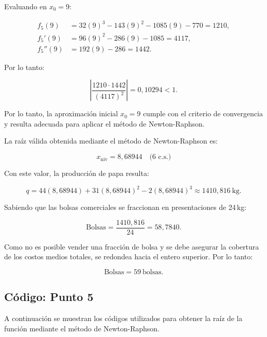 Evaluando en $x_0 = 9$:

\begin{align}
    f_5(9) &= 32(9)^3 - 143(9)^2 - 1085(9) - 770 = 1210, \\[4pt]
    f_5'(9) &= 96(9)^2 - 286(9) - 1085 = 4117, \\[4pt]
    f_5''(9) &= 192(9) - 286 = 1442.
\end{align}

Por lo tanto:

\begin{equation}
    \left|
    \frac{1210 \cdot 1442}
    {(4117)^2}
    \right|
    =
    0{,}10294 < 1.
\end{equation}

Por lo tanto, la aproximación inicial $x_0 = 9$ cumple con el criterio de convergencia y resulta adecuada para aplicar el método de Newton-Raphson.

La raíz válida obtenida mediante el método de Newton-Raphson es:

\begin{equation}
    \boxed{x_{\text{niv}} = 8{,}68944 \quad \text{(6 c.s.)}}
\end{equation}

Con este valor, la producción de papa resulta:

\begin{equation}
    q = 44(8{,}68944) + 31(8{,}68944)^2 - 2(8{,}68944)^3
    \approx 1410{,}816\ \text{kg}.
\end{equation}

Sabiendo que las bolsas comerciales se fraccionan en presentaciones de 24\,kg:

\begin{equation}
    \text{Bolsas}
    =
    \frac{1410{,}816}{24}
    =
    58{,}7840.
\end{equation}

Como no es posible vender una fracción de bolsa y se debe asegurar la cobertura de los costos medios totales, se redondea hacia el entero superior. Por lo tanto:

\begin{equation}
    \boxed{\text{Bolsas} = 59\ \text{bolsas}.}
\end{equation}

\subsection{Código: Punto 5}

A continuación se muestran los códigos utilizados para obtener la raíz de la función mediante el método de Newton-Raphson.

